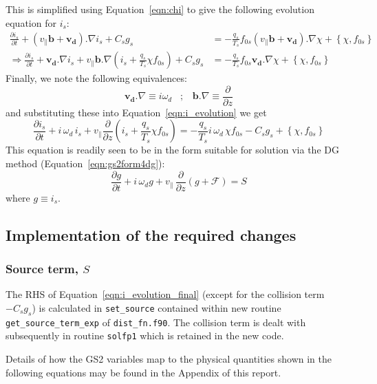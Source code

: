 \documentclass[10pt,a4paper]{article}
\newcommand{\dd}{\partial}
\begin{document}
This is simplified using Equation~\ref{eqn:chi} to give the following
evolution equation for $i_s$:
\begin{align}
  \frac{\dd i_s}{\dd t} + (v_\parallel \mathbf{b} + \mathbf{v_d}).\nabla i_s +
  C_s g_s & = - \frac{q_s}{T_s} f_{0s} (v_\parallel \mathbf{b} +
  \mathbf{v_d}).\nabla \chi + \left\{ \chi, f_{0s}\right\}
  \nonumber \\
  \Longrightarrow \frac{\dd i_s}{\dd t} + \mathbf{v_d}.\nabla i_s + v_\parallel
  \mathbf{b}.\nabla \left(i_s + \frac{q_s}{T_s} \chi f_{0s} \right) + C_s g_s
  & = - \frac{q_s}{T_s} f_{0s} \mathbf{v_d}.\nabla \chi + \left\{ \chi, f_{0s}\right\}
  \label{eqn:i_evolution} 
\end{align}
Finally, we note the following equivalences:
\[
\mathbf{v_d}.\nabla  \equiv i \omega_d \;\;\; ; \;\;\;
\mathbf{b}.\nabla \equiv \frac{\dd}{\dd z}
\]
and substituting these into Equation~\ref{eqn:i_evolution} we get
\begin{equation}
\boxed{
  \frac{\dd i_s}{\dd t} + i\,\omega_d\,i_s + v_\parallel \frac{\dd}{\dd z} \left(
    i_s + \frac{q_s}{T_s} \chi f_{0s} \right) = - \frac{q_s}{T_s} i\,\omega_d\,
  \chi f_{0s} - C_s g_s + \left\{ \chi, f_{0s}\right\}
\label{eqn:i_evolution_final}
}
\end{equation}
This equation is readily seen to be in the form suitable for solution via the
DG method (Equation~\ref{eqn:gs2form4dg}):
\[
\frac{\dd g}{\dd t} + i\,\omega_d g + v_\parallel\, \frac{\dd}{\dd z}(g+\mathcal{F}) = S
\]
where $g \equiv i_s$.

\subsection{Implementation of the required changes}

\subsubsection*{Source term, $S$}

The RHS of Equation~\ref{eqn:i_evolution_final} (except for the collision term
$-C_s g_s$) is calculated in \texttt{set\_source} contained within new routine
\texttt{get\_source\_term\_exp} of \texttt{dist\_fn.f90}. The collision term
is dealt with subsequently in routine \texttt{solfp1} which is retained in the
new code.

Details of how the GS2 variables map to the physical quantities shown in the
following equations may be found in the Appendix of this report.
\end{document}
